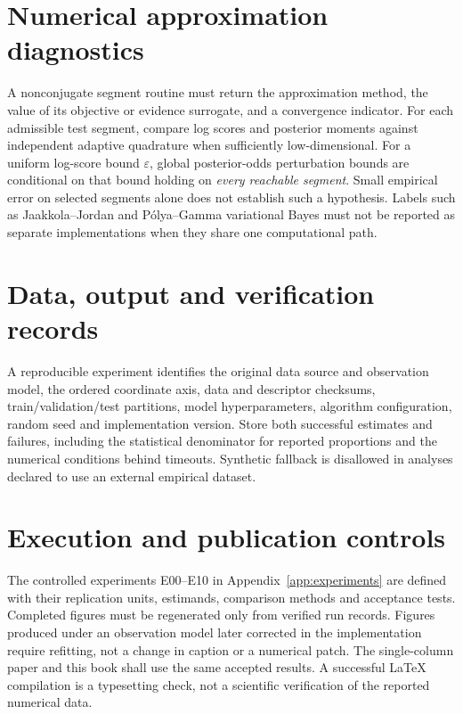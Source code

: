 \section{Numerical approximation diagnostics}
A nonconjugate segment routine must return the approximation method, the value of its objective
or evidence surrogate, and a convergence indicator. For each admissible test segment, compare
log scores and posterior moments against independent adaptive quadrature when sufficiently
low-dimensional. For a uniform log-score bound $\varepsilon$, global posterior-odds perturbation
bounds are conditional on that bound holding on \emph{every reachable segment}. Small empirical
error on selected segments alone does not establish such a hypothesis. Labels such as
Jaakkola--Jordan and P\'olya--Gamma variational Bayes must not be reported as separate
implementations when they share one computational path.

\section{Data, output and verification records}
A reproducible experiment identifies the original data source and observation model, the ordered
coordinate axis, data and descriptor checksums, train/validation/test partitions, model
hyperparameters, algorithm configuration, random seed and implementation version. Store both
successful estimates and failures, including the statistical denominator for reported
proportions and the numerical conditions behind timeouts. Synthetic fallback is disallowed in
analyses declared to use an external empirical dataset.

\section{Execution and publication controls}
The controlled experiments E00--E10 in Appendix~\ref{app:experiments} are defined with their
replication units, estimands, comparison methods and acceptance tests. Completed figures must
be regenerated only from verified run records. Figures produced under an observation model later
corrected in the implementation require refitting, not a change in caption or a numerical patch.
The single-column paper and this book shall use the same accepted results. A successful LaTeX
compilation is a typesetting check, not a scientific verification of the reported numerical data.
